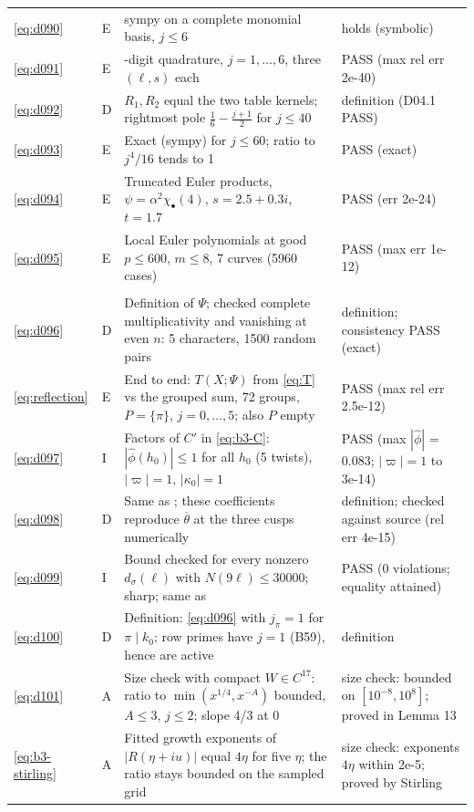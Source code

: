 \documentclass[11pt]{article}
\numberwithin{equation}{section}
\begin{document}
\begin{longtable}{@{}>{\raggedright\arraybackslash}p{1.2cm}>{\centering\arraybackslash}p{0.7cm}>{\raggedright\arraybackslash}p{9.05cm}>{\raggedright\arraybackslash}p{4.3cm}@{}}
\eqref{eq:d090} & E & sympy on a complete monomial basis, $j\le6$ & holds (symbolic)\\
\eqref{eq:d091} & E & 40-digit quadrature, $j=1,\dots,6$, three $(\ell,s)$ each & PASS (max rel err 2e-40)\\
\eqref{eq:d092} & D & $R_1,R_2$ equal the two table kernels; rightmost pole $\frac16-\frac{j+1}2$ for $j\le40$ & definition (D04.1 PASS)\\
\eqref{eq:d093} & E & Exact (sympy) for $j\le60$; ratio to $j^4/16$ tends to 1 & PASS (exact)\\
\eqref{eq:d094} & E & Truncated Euler products, $\psi=\alpha^2\chi_\bullet(4)$, $s=2.5+0.3i$, $t=1.7$ & PASS (err 2e-24)\\
\eqref{eq:d095} & E & Local Euler polynomials at good $p\le600$, $m\le8$, 7 curves (5960 cases) & PASS (max err 1e-12)\\
\multicolumn{4}{@{}l}{\emph{Appendix~A}}\\
\eqref{eq:d096} & D & Definition of $\Psi$; checked complete multiplicativity and vanishing at even $n$: 5 characters, 1500 random pairs & definition; consistency PASS (exact)\\
\eqref{eq:reflection} & E & End to end: $T(X;\Psi)$ from \eqref{eq:T} vs the grouped sum, 72 groups, $P=\{\pi\}$, $j=0,\dots,5$; also $P$ empty & PASS (max rel err 2.5e-12)\\
\eqref{eq:d097} & I & Factors of $C'$ in \eqref{eq:b3-C}: $|\hat\phi(h_0)|\le1$ for all $h_0$ (5 twists), $|\varpi|=1$, $|\kappa_0|=1$ & PASS (max $|\hat\phi|$ = 0.083; $|\varpi|=1$ to 3e-14)\\
\eqref{eq:d098} & D & Same as \cite[Theorem~23 (T3)]{QF}; these coefficients reproduce $\overline\theta$ at the three cusps numerically & definition; checked against source (rel err 4e-15)\\
\eqref{eq:d099} & I & Bound checked for every nonzero $d_\sigma(\ell)$ with $N(9\ell)\le30000$; sharp; same as \cite[Corollary~24]{QF} & PASS (0 violations; equality attained)\\
\eqref{eq:d100} & D & Definition: \eqref{eq:d096} with $j_\pi=1$ for $\pi\mid k_0$; row primes have $j=1$ (B59), hence are active & definition\\
\eqref{eq:d101} & A & Size check with compact $W\in C^{17}$: ratio to $\min(x^{1/4},x^{-A})$ bounded, $A\le3$, $j\le2$; slope 4/3 at 0 & size check: bounded on $[10^{-8},10^8]$; proved in Lemma 13\\
\eqref{eq:b3-stirling} & A & Fitted growth exponents of $|R(\eta+iu)|$ equal $4\eta$ for five $\eta$; the ratio stays bounded on the sampled grid & size check: exponents $4\eta$ within 2e-5; proved by Stirling\\

\end{longtable}
\end{document}
